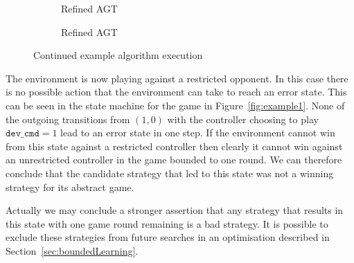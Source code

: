 \begin{figure}
\begin{subfigure}[t]{0.3\textwidth}
        \centering
        \begin{minipage}[t][2.2cm][t]{\textwidth}
        \end{minipage}
        \caption{Refined AGT}
        \label{fig:example1f}
    \end{subfigure}%
    \begin{subfigure}[t]{0.3\textwidth}
        \centering
        \begin{minipage}[t][2.2cm][t]{\textwidth}
        \end{minipage}
        \caption{Refined AGT}
        \label{fig:example1g}
    \end{subfigure}%
    \caption{Continued example algorithm execution}
    \label{fig:example1execont}
\end{figure}

The environment is now playing against a restricted opponent. In this case there is no possible action that the environment can take to reach an error state. This can be seen in the state machine for the game in Figure~\ref{fig:example1}. 
None of the outgoing transitions from $(1, 0)$ with the controller choosing to play $\texttt{dev\_cmd} = 1$ lead to an error state in one step.  If the environment cannot win from this state against a restricted controller then clearly it cannot win against an unrestricted controller in the game bounded to one round. We can therefore conclude that the candidate strategy that led to this state was not a winning strategy for its abstract game.

Actually we may conclude a stronger assertion that any strategy that results in this state with one game round remaining is a bad strategy. It is possible to exclude these strategies from future searches in an optimisation described in Section~\ref{sec:boundedLearning}.

